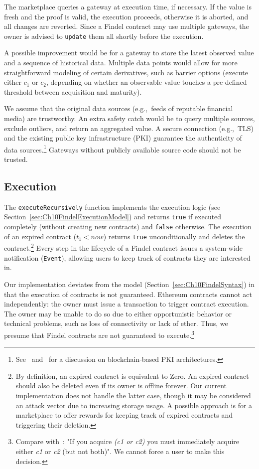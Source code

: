 The marketplace queries a gateway at execution time, if necessary.
If the value is fresh and the proof is valid, the execution proceeds, otherwise it is aborted, and all changes are reverted.
Since a Findel contract may use multiple gateways, the owner is advised to \texttt{update} them all shortly before the execution.

A possible improvement would be for a gateway to store the latest observed value and a sequence of historical data.
Multiple data points would allow for more straightforward modeling of certain derivatives, such as barrier options (execute either \(c_1\) or \(c_2\), depending on whether an observable value touches a pre-defined threshold between acquisition and maturity).

We assume that the original data sources (e.g.,~feeds of reputable financial media) are trustworthy.
An extra safety catch would be to query multiple sources, exclude outliers, and return an aggregated value.
A secure connection (e.g.,~TLS) and the existing public key infrastructure (PKI) guarantee the authenticity of data sources.\footnote{See~\cite{Fromknecht2014} and~\cite{Lewison2016} for a discussion on blockchain-based PKI architectures.}
Gateways without publicly available source code should not be trusted.


\subsection{Execution} \label{sec:Ch10FindelExecutionImplementation}

The \texttt{executeRecursively} function implements the execution logic (see Section~\ref{sec:Ch10FindelExecutionModel}) and returns \texttt{true} if executed completely (without creating new contracts) and \texttt{false} otherwise.
The execution of an expired contract ($t_1 < now$) returns \texttt{true} unconditionally and deletes the contract.\footnote{By definition, an expired contract is equivalent to \(\mathrm{Zero}\). An expired contract should also be deleted even if its owner is offline forever. Our current implementation does not handle the latter case, though it may be considered an attack vector due to increasing storage usage. A possible approach is for a marketplace to offer rewards for keeping track of expired contracts and triggering their deletion.}
Every step in the lifecycle of a Findel contract issues a system-wide notification (\texttt{Event}), allowing users to keep track of contracts they are interested in.

Our implementation deviates from the model (Section~\ref{sec:Ch10FindelSyntax}) in that the execution of contracts is not guaranteed.
Ethereum contracts cannot act independently: the owner must issue a transaction to trigger contract execution.
The owner may be unable to do so due to either opportunistic behavior or technical problems, such as loss of connectivity or lack of ether.
Thus, we presume that Findel contracts are not guaranteed to execute.\footnote{Compare with~\cite{PeytonJones2000}: "If you acquire \textit{(c1 or c2)} you must immediately acquire either \textit{c1} or \textit{c2} (but not both)". We cannot force a user to make this decision.}


